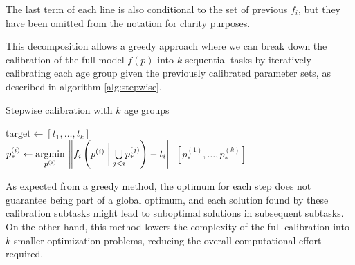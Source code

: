 \documentclass{IOS-Book-Article}
\newcommand\norm[1]{\left\lVert#1\right\rVert}
\begin{document}
The last term of each line is also conditional to the set of previous $f_i$, but they have been omitted from the notation for clarity purposes.

This decomposition allows a greedy approach where we can break down the calibration of the full model $f(p)$ into $k$ sequential tasks by iteratively calibrating each age group given the previously calibrated parameter sets, as described in algorithm \ref{alg:stepwise}.
 	
 	\begin{algorithm}[h!]
 		\caption{Stepwise calibration with $k$ age groups}\label{alg:stepwise}
 		\begin{algorithmic}
 			\State $\mathrm{target} \gets [t_1, \dots, t_k]$
 			 \\
 			\State $p_*^{(i)} \gets \underset{p^{(i)}}{\mathrm{argmin}}\, \norm{f_i\left(p^{(i)} \hspace{0.25em} \bigg| \hspace{0.25em} \underset{j < i}{\bigcup} p_*^{(j)} \right) -  t_i}$
 			\EndFor
 			\State \Return $[p_*^{(1)}, \dots, p_*^{(k)}]$
 		\end{algorithmic}
 	\end{algorithm}
 	
 	As expected from a greedy method, the optimum for each step does not guarantee being part of a global optimum, and each solution found by these calibration subtasks might lead to suboptimal solutions in subsequent subtasks. On the other hand, this method lowers the complexity of the full calibration into $k$ smaller optimization problems, reducing the overall computational effort required.
 	
 	
 
 	
\end{document}
